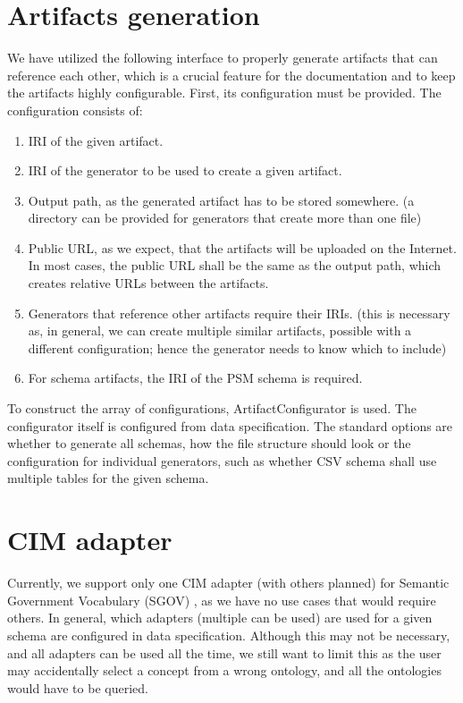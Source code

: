 \section{Artifacts generation}

We have utilized the following interface to properly generate artifacts that can reference each other, which is a crucial feature for the documentation and to keep the artifacts highly configurable. First, its configuration must be provided. The configuration consists of:

\begin{enumerate}
    \item IRI of the given artifact.
    \item IRI of the generator to be used to create a given artifact.
    \item Output path, as the generated artifact has to be stored somewhere. (a directory can be provided for generators that create more than one file)
    \item Public URL, as we expect, that the artifacts will be uploaded on the Internet. In most cases, the public URL shall be the same as the output path, which creates relative URLs between the artifacts.
    \item Generators that reference other artifacts require their IRIs. (this is necessary as, in general, we can create multiple similar artifacts, possible with a different configuration; hence the generator needs to know which to include)
    \item For schema artifacts, the IRI of the PSM schema is required.
\end{enumerate}

To construct the array of configurations, ArtifactConfigurator is used. The configurator itself is configured from data specification. The standard options are whether to generate all schemas, how the file structure should look or the configuration for individual generators, such as whether CSV schema shall use multiple tables for the given schema.

\section{CIM adapter}

Currently, we support only one CIM adapter (with others planned) for Semantic Government Vocabulary (SGOV) \cite{kvremen2019improving}, as we have no use cases that would require others. In general, which adapters (multiple can be used) are used for a given schema are configured in data specification. Although this may not be necessary, and all adapters can be used all the time, we still want to limit this as the user may accidentally select a concept from a wrong ontology, and all the ontologies would have to be queried.

